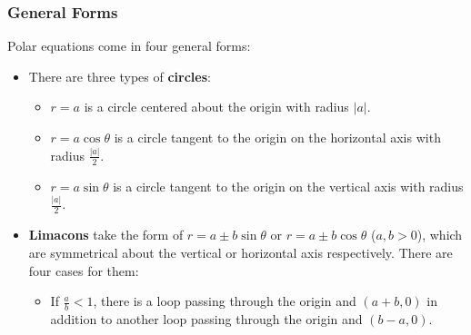 \documentclass[../AP_Calculus]{subfiles}
\begin{document}
		\subsubsection*{General Forms}
			Polar equations come in four general forms:
			\begin{itemize}
				\item There are three types of \textbf{circles}:
					\begin{itemize}
						\item $r = a$ is a circle centered about the origin with radius $|a|$.
							\begin{center}
							\end{center}
						\item $r = a\cos\theta$ is a circle tangent to the origin on the horizontal axis with radius $\frac{|a|}{2}$.
							\begin{center}
							\end{center}
						\item $r = a\sin\theta$ is a circle tangent to the origin on the vertical axis with radius $\frac{|a|}{2}$.
							\begin{center}
							\end{center}
					\end{itemize}
				\item \textbf{Limacons} take the form of $r = a\pm b\sin\theta$ or $r = a\pm b\cos\theta$ ($a, b > 0$), which are symmetrical about the vertical or horizontal axis respectively. There are four cases for them:
					\begin{itemize}
						\item If $\frac{a}{b} < 1$, there is a loop passing through the origin and $(a + b, 0)$ in addition to another loop passing through the origin and $(b - a, 0)$.
							\begin{center}
								\begin{tikzpicture}

\end{tikzpicture}
\end{center}
\end{itemize}
\end{itemize}
\end{document}

